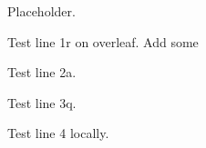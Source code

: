 

Placeholder.

Test line 1r on overleaf. Add some 

Test line 2a.

Test line 3q.

Test line 4 locally.

